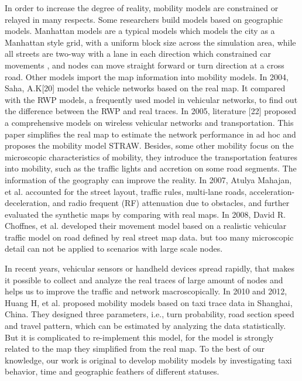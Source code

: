 In order to increase the degree of reality, mobility models are constrained or relayed in many respects. Some researchers build models based on geographic models. Manhattan models are a typical models which models the city as a Manhattan style grid, with a uniform block size across the simulation area, while all streets are two-way with a lane in each direction which constrained car movements \cite{MartinezCano-87}, and nodes can move straight forward or turn direction at a cross road.
Other models import the map information into mobility models. In 2004, Saha, A.K[20] model the vehicle networks based on the real map. It compared with the RWP models, a frequently used model in vehicular networks, to find out the difference between the RWP and real traces. In 2005, literature [22] proposed a comprehensive models on wireless vehicular networks and transportation. This paper simplifies the real map to estimate the network performance in ad hoc and proposes the mobility model STRAW. Besides, some other mobility focus on the microscopic characteristics of mobility, they introduce the transportation features into mobility, such as the traffic lights and accretion on some road segments. The information of the geography can improve the reality. In 2007, Atulya Mahajan, et al. \cite{MahajanPotnis-102} accounted for the street layout, traffic rules, multi-lane roads, acceleration-deceleration, and radio frequent (RF) attenuation due to obstacles, and further evaluated the synthetic maps by comparing with real maps. In 2008, David R. Choffnes, et al.\cite{ChoffnesBustamante-93} developed their movement model based on a realistic vehicular traffic model on road defined by real street map data. but too many microscopic detail can not be applied to scenarios with large scale nodes.

In recent years, vehicular sensors or handheld devices spread rapidly, that makes it possible to collect and analyze the real traces of large amount of nodes and helps us to improve the traffic and network macroscopically.
In 2010 and 2012, Huang H, et al. \cite{HuangZhu-88,HuangZhang-105} proposed mobility models based on taxi trace data in Shanghai, China. They designed three parameters, i.e., turn probability, road section speed and travel pattern, which can be estimated by analyzing the data statistically. But it is complicated to re-implement this model, for the model is strongly related to the map they simplified from the real map.
To the best of our knowledge, our work is original to develop mobility models by investigating taxi behavior, time and geographic feathers of different statuses.
